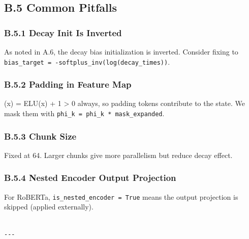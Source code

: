 \subsection{B.5 Common Pitfalls}

\subsubsection{B.5.1 Decay Init Is Inverted}

As noted in A.6, the decay bias initialization is inverted. Consider 
fixing to \texttt{bias\_target = -softplus\_inv(log(decay\_times))}.

\subsubsection{B.5.2 Padding in Feature Map}

 (x) = ELU(x) + 1 \textgreater{} 0 always, so padding tokens contribute to the state. 
We mask them with \texttt{phi\_k = phi\_k * mask\_expanded}.

\subsubsection{B.5.3 Chunk Size}

Fixed at 64. Larger chunks give more parallelism but reduce decay effect.

\subsubsection{B.5.4 Nested Encoder Output Projection}

For RoBERTa, \texttt{is\_nested\_encoder = True} means the output projection is 
skipped (applied externally).
\begin{lstlisting}

---
\end{lstlisting}